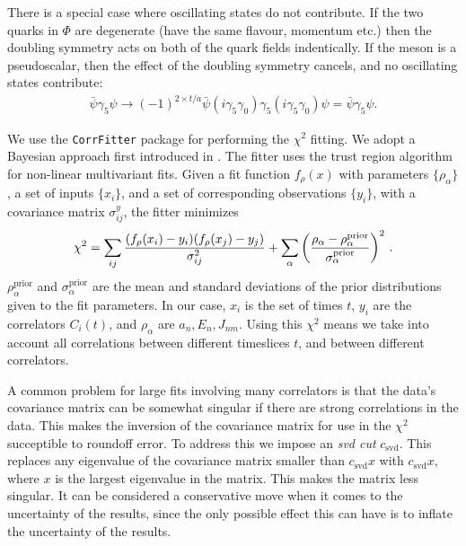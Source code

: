 There is a special case where oscillating states do not contribute. If the two quarks in $\Phi$ are degenerate (have the same flavour, momentum etc.) then the doubling symmetry acts on both of the quark fields indentically. If the meson is a pseudoscalar, then the effect of the doubling symmetry cancels, and no oscillating states contribute:
\begin{align}
  \bar{\psi}\gamma_5 \psi \to (-1)^{2\times t/a} \bar{\psi} (i\gamma_5\gamma_0) \gamma_5 (i\gamma_5\gamma_0) \psi = \bar{\psi}\gamma_5\psi.
\end{align}

We use the \texttt{CorrFitter} package \cite{CorrFitter} for performing the $\chi^2$ fitting. We adopt a Bayesian approach first introduced in \cite{Lepage:2001ym}. The fitter uses the trust region algorithm for non-linear multivariant fits. Given a fit function $f_{\rho}(x)$ with parameters $\{\rho_{\alpha}\}$, a set of inputs $\{x_i\}$, and a set of corresponding observations $\{y_i\}$, with a covariance matrix $\sigma^y_{ij}$, the fitter minimizes
\begin{align}
  \chi^2 = \sum_{ij} {( f_{\rho}(x_i) - y_i )( f_{\rho}(x_j) - y_j )\over \sigma_{ij}^{2}} + \sum_{\alpha}\left({\rho_{\alpha}-\rho^{\text{prior}}_{\alpha}\over\sigma_{\alpha}^{\text{prior}}}\right)^2\,.
\end{align}
$\rho_{\alpha}^{\text{prior}}$ and $\sigma_{\alpha}^{\text{prior}}$ are the mean and standard deviations of the prior distributions given to the fit parameters. In our case, $x_i$ is the set of times $t$, $y_i$ are the correlators $C_i(t)$, and $\rho_{\alpha}$ are $a_n,E_n,J_{nm}$. Using this $\chi^2$ means we take into account all correlations between different timeslices $t$, and between different correlators.

A common problem for large fits involving many correlators is that the data’s covariance  matrix can be somewhat singular if there are strong correlations in the data. This makes the inversion of the covariance matrix for use in the $\chi^2$ succeptible to roundoff error. To address this we impose an {\it{svd cut}} $c_{\text{svd}}$. This replaces any eigenvalue of the covariance matrix smaller than $c_{\text{svd}} x$ with $c_{\text{svd}}x$, where $x$ is the largest eigenvalue in the matrix. This makes the matrix less singular. It can be considered a conservative move when it comes to the uncertainty of the results, since the only possible effect this can have is to inflate the uncertainty of the results.

